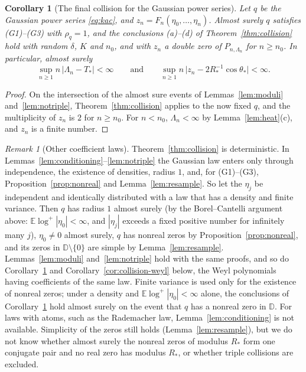 \documentclass[11pt]{amsart}
\newtheorem{corollary}[theorem]{Corollary}
\theoremstyle{definition}
\theoremstyle{remark}
\newtheorem{remark}[theorem]{Remark}
\numberwithin{equation}{section}
\newcommand{\D}{\mathbb{D}}
\newcommand{\E}{\mathbb{E}}
\begin{document}
\begin{corollary}[The final collision for the Gaussian power series]\label{cor:collision-gauss}
Let $q$ be the Gaussian power series \eqref{eq:kac}, and $z_n=F_n(\eta_0,\dots,\eta_n)$. Almost surely $q$ satisfies (G1)--(G3) with $\rho_q=1$, and the conclusions (a)--(d) of Theorem~\ref{thm:collision} hold with random $\delta$, $K$ and $n_0$, and with $z_n$ a double zero of $P_{n,\Lambda_n}$ for $n\ge n_0$. In particular, almost surely
\[
\sup_{n\ge1}n\,|\Lambda_n-T_*|<\infty\qquad\text{and}\qquad\sup_{n\ge1}n\,\bigl|z_n-2R_*^{-1}\cos\theta_*\bigr|<\infty .
\]
\end{corollary}

\begin{proof}
On the intersection of the almost sure events of Lemmas~\ref{lem:moduli} and~\ref{lem:notriple}, Theorem~\ref{thm:collision} applies to the now fixed $q$, and the multiplicity of $z_n$ is $2$ for $n\ge n_0$. For $n<n_0$, $\Lambda_n<\infty$ by Lemma~\ref{lem:heat}(c), and $z_n$ is a finite number.
\end{proof}

\begin{remark}[Other coefficient laws]\label{rem:collision-laws}
Theorem~\ref{thm:collision} is deterministic. In Lemmas~\ref{lem:conditioning}--\ref{lem:notriple} the Gaussian law enters only through independence, the existence of densities, radius $1$, and, for (G1)--(G3), Proposition~\ref{prop:nonreal} and Lemma~\ref{lem:resample}. So let the $\eta_j$ be independent and identically distributed with a law that has a density and finite variance. Then $q$ has radius $1$ almost surely (by the Borel--Cantelli argument above: $\E\log^+|\eta_0|<\infty$, and $|\eta_j|$ exceeds a fixed positive number for infinitely many $j$), $\eta_0\ne0$ almost surely, $q$ has nonreal zeros by Proposition~\ref{prop:nonreal}, and its zeros in $\D\setminus\{0\}$ are simple by Lemma~\ref{lem:resample}. Lemmas~\ref{lem:moduli} and~\ref{lem:notriple} hold with the same proofs, and so do Corollary~\ref{cor:collision-gauss} and Corollary~\ref{cor:collision-weyl} below, the Weyl polynomials having coefficients of the same law. Finite variance is used only for the existence of nonreal zeros; under a density and $\E\log^+|\eta_0|<\infty$ alone, the conclusions of Corollary~\ref{cor:collision-gauss} hold almost surely on the event that $q$ has a nonreal zero in $\D$. For laws with atoms, such as the Rademacher law, Lemma~\ref{lem:conditioning} is not available. Simplicity of the zeros still holds (Lemma~\ref{lem:resample}), but we do not know whether almost surely the nonreal zeros of modulus $R_*$ form one conjugate pair and no real zero has modulus $R_*$, or whether triple collisions are excluded.
\end{remark}
\end{document}

